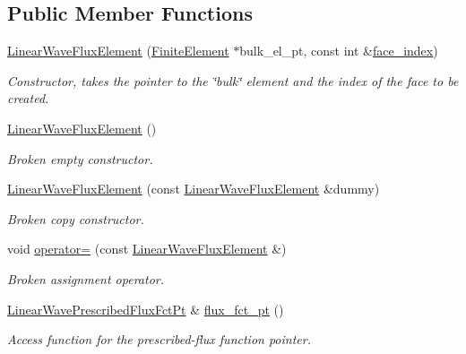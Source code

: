 \subsection*{Public Member Functions}
\begin{DoxyCompactItemize}
\item 
\hyperlink{classoomph_1_1LinearWaveFluxElement_a40752d5ceccceb1fa0ee94feb4760468}{Linear\+Wave\+Flux\+Element} (\hyperlink{classoomph_1_1FiniteElement}{Finite\+Element} $\ast$bulk\+\_\+el\+\_\+pt, const int \&\hyperlink{classoomph_1_1FaceElement_a478d577ac6db67ecc80f1f02ae3ab170}{face\+\_\+index})
\begin{DoxyCompactList}\small\item\em Constructor, takes the pointer to the \char`\"{}bulk\char`\"{} element and the index of the face to be created. \end{DoxyCompactList}\item 
\hyperlink{classoomph_1_1LinearWaveFluxElement_aa87a90e74c1f27929ab60d7fef3044fd}{Linear\+Wave\+Flux\+Element} ()
\begin{DoxyCompactList}\small\item\em Broken empty constructor. \end{DoxyCompactList}\item 
\hyperlink{classoomph_1_1LinearWaveFluxElement_ad691eb5035646eb94520bb79103928d9}{Linear\+Wave\+Flux\+Element} (const \hyperlink{classoomph_1_1LinearWaveFluxElement}{Linear\+Wave\+Flux\+Element} \&dummy)
\begin{DoxyCompactList}\small\item\em Broken copy constructor. \end{DoxyCompactList}\item 
void \hyperlink{classoomph_1_1LinearWaveFluxElement_a9b7ef9dfc2f7781275a7f31194bc5093}{operator=} (const \hyperlink{classoomph_1_1LinearWaveFluxElement}{Linear\+Wave\+Flux\+Element} \&)
\begin{DoxyCompactList}\small\item\em Broken assignment operator. \end{DoxyCompactList}\item 
\hyperlink{classoomph_1_1LinearWaveFluxElement_a4010abac8856733ae2b152bc41e7b558}{Linear\+Wave\+Prescribed\+Flux\+Fct\+Pt} \& \hyperlink{classoomph_1_1LinearWaveFluxElement_a00946fd9acf1e2d85a6a3f31e3d7500e}{flux\+\_\+fct\+\_\+pt} ()
\begin{DoxyCompactList}\small\item\em Access function for the prescribed-\/flux function pointer. \end{DoxyCompactList}\item 

\end{DoxyCompactItemize}
